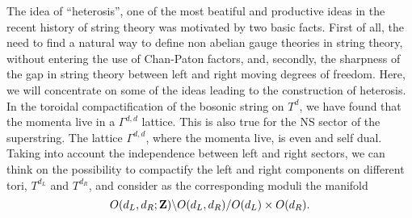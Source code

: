 The idea of ``heterosis'', one of the most beatiful and
productive ideas in the recent history of string theory \cite{Gross} was
motivated by two basic facts. First of all, the need to find a
natural way to define non abelian gauge theories in string
theory, without entering the use of Chan-Paton factors, and,
secondly, the sharpness of the gap in string theory between left
and right moving degrees of freedom. Here, we will concentrate on
some of the ideas leading to the construction of heterosis. In
the toroidal compactification of the bosonic string on $T^d$,
we have found that the momenta live in a $\Gamma^{d,d}$ lattice.
This is also true for the NS sector of the superstring. The
lattice $\Gamma^{d,d}$, where the momenta live, is even and self
dual. Taking into account the independence between left and right
sectors, we can think on the possibility to compactify the left
and right components on different tori, $T^{d_L}$ and  $T^{d_R}$,
and consider as the corresponding moduli the manifold
\begin{equation}
O(d_L,d_R;{\bf Z}) \backslash O(d_L,d_R) / O(d_L) \times O(d_R).
\label{eq:III69}
\end{equation}
  
